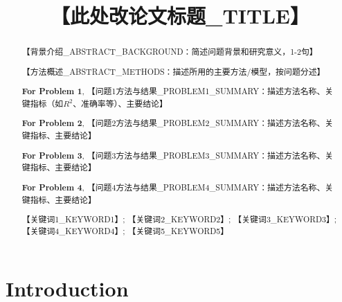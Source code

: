 \documentclass{mcmthesis}
\title{【此处改论文标题_TITLE】}
\begin{document}
\begin{abstract}
\setlength{\parindent}{1.5em}
\indent 


【背景介绍_ABSTRACT_BACKGROUND：简述问题背景和研究意义，1-2句】

【方法概述_ABSTRACT_METHODS：描述所用的主要方法/模型，按问题分述】

\textbf{For Problem 1}, 【问题1方法与结果_PROBLEM1_SUMMARY：描述方法名称、关键指标（如$R^2$、准确率等）、主要结论】

\textbf{For Problem 2}, 【问题2方法与结果_PROBLEM2_SUMMARY：描述方法名称、关键指标、主要结论】

\textbf{For Problem 3}, 【问题3方法与结果_PROBLEM3_SUMMARY：描述方法名称、关键指标、主要结论】

\textbf{For Problem 4}, 【问题4方法与结果_PROBLEM4_SUMMARY：描述方法名称、关键指标、主要结论】


\begin{keywords}
【关键词1_KEYWORD1】; 【关键词2_KEYWORD2】; 【关键词3_KEYWORD3】; 【关键词4_KEYWORD4】; 【关键词5_KEYWORD5】
\end{keywords}
\end{abstract}

\maketitle

\setcounter{page}{2}           %
\tableofcontents               %
\newpage

\section{Introduction}
\end{document}
